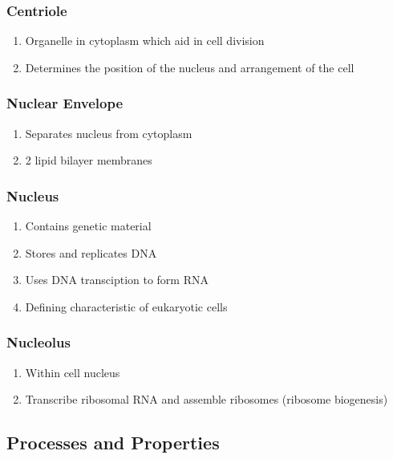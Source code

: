 \documentclass{notes}
\begin{document}
\subsubsection*{Centriole}

\begin{enumerate}
    \item Organelle in cytoplasm which aid in cell division
    \item Determines the position of the nucleus and arrangement of the cell
\end{enumerate}

\subsubsection*{Nuclear Envelope}

\begin{enumerate}
    \item Separates nucleus from cytoplasm
    \item 2 lipid bilayer membranes
\end{enumerate}

\subsubsection*{Nucleus}

\begin{enumerate}
    \item Contains genetic material
    \item Stores and replicates DNA
    \item Uses DNA transciption to form RNA
    \item Defining characteristic of eukaryotic cells
\end{enumerate}

\subsubsection*{Nucleolus}

\begin{enumerate}
    \item Within cell nucleus
    \item Transcribe ribosomal RNA and assemble ribosomes (ribosome biogenesis)
\end{enumerate}


\subsection{Processes and Properties}
\end{document}

